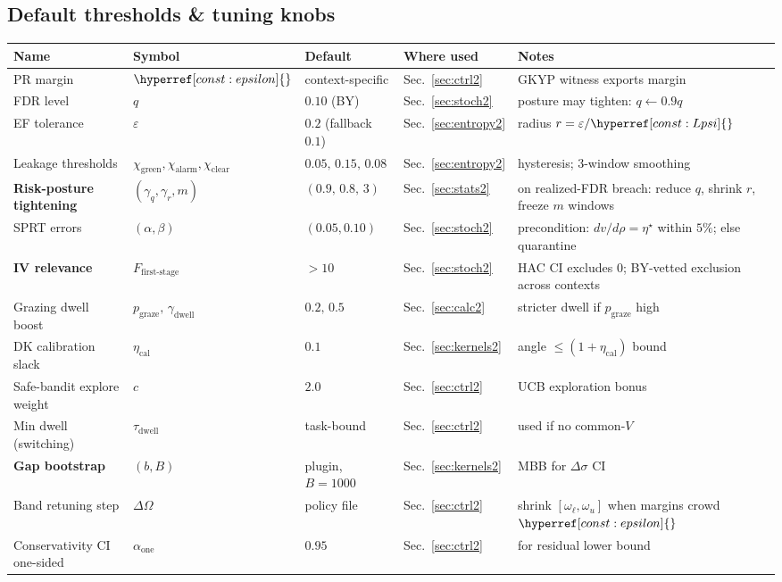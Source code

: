 \documentclass[10pt]{article}
\newcommand{\cutq}{q}
\newcommand{\constref}[1]{\hyperref[const:#1]{\ensuremath{\csname constsym#1\endcsname}}}
\begin{document}
\subsection{Default thresholds \& tuning knobs}\label{app:defaults}
\begin{center}
\renewcommand{\arraystretch}{1.12}
\begin{tabularx}{\textwidth}{@{} l l l l l @{}}
\toprule
\textbf{Name} & \textbf{Symbol} & \textbf{Default} & \textbf{Where used} & \textbf{Notes} \\
\midrule
PR margin & $\constref{epsilon}$ & context-specific & Sec.~\ref{sec:ctrl2} & GKYP witness exports margin \\
FDR level & $\cutq$ & $0.10$ (BY) & Sec.~\ref{sec:stoch2} & posture may tighten: $\cutq\!\leftarrow\!0.9\cutq$ \\
EF tolerance & $\varepsilon$ & $0.2$ (fallback $0.1$) & Sec.~\ref{sec:entropy2} & radius $r=\varepsilon/\constref{Lpsi}$ \\
Leakage thresholds & $\chi_{\mathrm{green}},\chi_{\mathrm{alarm}},\chi_{\mathrm{clear}}$ & $0.05,\,0.15,\,0.08$ & Sec.~\ref{sec:entropy2} & hysteresis; 3-window smoothing \\
\textbf{Risk-posture tightening} & $(\gamma_q,\gamma_r,m)$ & $(0.9,\,0.8,\,3)$ & Sec.~\ref{sec:stats2} & on realized-FDR breach: reduce $q$, shrink $r$, freeze $m$ windows \\
SPRT errors & $(\alpha,\beta)$ & $(0.05,0.10)$ & Sec.~\ref{sec:stoch2} & precondition: $dv/d\rho=\eta^\star$ within $5\%$; else quarantine \\
\textbf{IV relevance} & $F_{\text{first-stage}}$ & $>10$ & Sec.~\ref{sec:stoch2} & HAC CI excludes 0; BY-vetted exclusion across contexts \\
Grazing dwell boost & $p_{\mathrm{graze}},\,\gamma_{\mathrm{dwell}}$ & $0.2,\,0.5$ & Sec.~\ref{sec:calc2} & stricter dwell if $p_{\mathrm{graze}}$ high \\
DK calibration slack & $\eta_{\mathrm{cal}}$ & $0.1$ & Sec.~\ref{sec:kernels2} & angle $\le (1+\eta_{\mathrm{cal}})$ bound \\
Safe-bandit explore weight & $c$ & $2.0$ & Sec.~\ref{sec:ctrl2} & UCB exploration bonus \\
Min dwell (switching) & $\tau_{\mathrm{dwell}}$ & task-bound & Sec.~\ref{sec:ctrl2} & used if no common-$V$ \\
\textbf{Gap bootstrap} & $(b,B)$ & plugin, $B{=}1000$ & Sec.~\ref{sec:kernels2} & MBB for $\Delta\sigma$ CI \\
Band retuning step & $\Delta\Omega$ & policy file & Sec.~\ref{sec:ctrl2} & shrink $[\omega_\ell,\omega_u]$ when margins crowd $\constref{epsilon}$ \\
Conservativity CI one-sided & $\alpha_{\mathrm{one}}$ & $0.95$ & Sec.~\ref{sec:ctrl2} & for residual lower bound \\
\bottomrule
\end{tabularx}
\end{center}
\end{document}
